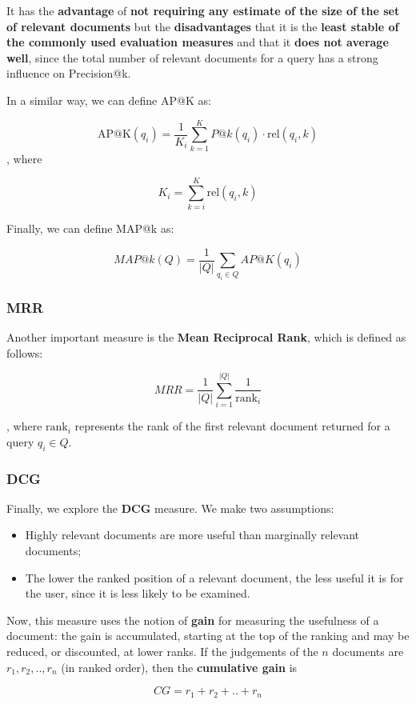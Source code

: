 It has the \textbf{advantage} of \textbf{not requiring any estimate of the size of the set of relevant documents} but the \textbf{disadvantages} that it is the \textbf{least stable of the commonly used evaluation measures} and that it \textbf{does not average well}, since the total number of relevant documents for a query has a strong influence on Precision@k.

In a similar way, we can define AP@K as:

$$
\text{AP@K}(q_i) =  \frac{1}{K_i} \sum_{k = 1}^K P@k(q_i) \cdot \text{rel}(q_i, k)
$$
, where

$$
K_i = \sum_{k = i}^K \text{rel}(q_i, k)
$$

Finally, we can define MAP@k as:

$$
MAP@k(Q) = \frac{1}{|Q|} \sum_{q_i \in Q} AP@K(q_i)
$$

\subsubsection{MRR}
Another important measure is the \textbf{Mean Reciprocal Rank}, which is defined as follows:

$$
MRR = \frac{1}{|Q|} \sum_{i = 1}^{|Q|} \frac{1}{\text{rank}_i}
$$

, where $\text{rank}_i$ represents the rank of the first relevant document returned for a query $q_i \in Q$.

\subsubsection{DCG}
Finally, we explore the \textbf{DCG} measure. We make two assumptions:

\begin{itemize}
    \item Highly relevant documents are more useful than marginally relevant documents;
    \item The lower the ranked position of a relevant document, the less useful it is for the user, since it is less likely to be examined.
\end{itemize}

Now, this measure uses the notion of \textbf{gain} for measuring the usefulness of a document: the gain is accumulated, starting at the top of the ranking and may be reduced, or discounted, at lower ranks. If the judgements of the $n$ documents are $r_1, r_2, .., r_n$ (in ranked order), then the \textbf{cumulative gain} is 

$$
CG = r_1 + r_2 + .. + r_n
$$

